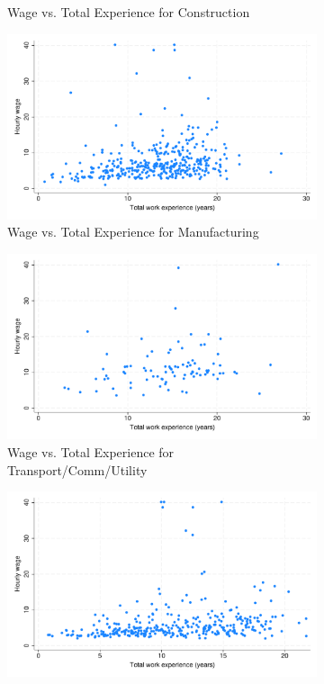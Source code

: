 \documentclass{article}
\begin{document}
\begin{figure}[H]
\begin{subfigure}{.3\textwidth}
  \caption{Wage vs. Total Experience for Construction}
\end{subfigure}
\begin{subfigure}{.3\textwidth}
  \includegraphics[width = 1.00\textwidth]{./figures/scatter_wage_ind4.pdf}  
  \caption{Wage vs. Total Experience for Manufacturing}
\end{subfigure}
\begin{subfigure}{.3\textwidth}
  \includegraphics[width = 1.00\textwidth]{./figures/scatter_wage_ind5.pdf}  
  \caption{Wage vs. Total Experience for Transport/Comm/Utility}
\end{subfigure}
\begin{subfigure}{.3\textwidth}
  \includegraphics[width = 1.00\textwidth]{./figures/scatter_wage_ind6.pdf}  

\end{subfigure}
\end{figure}
\end{document}
